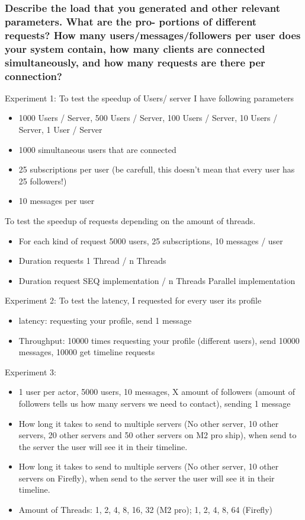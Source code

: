 \documentclass[a4paper]{article}
\begin{document}
\subsubsection{Describe the load that you generated and other relevant parameters. What are the pro-
portions of different requests? How many users/messages/followers per user does your
system contain, how many clients are connected simultaneously, and how many requests
are there per connection?}
        	Experiment 1:
		To test the speedup of Users/ server I have following parameters
		\begin{itemize}
			\item  1000 Users / Server, 500 Users / Server, 100 Users / Server, 10 Users / Server, 1 User / Server 
			\item  1000 simultaneous users that are connected
			\item  25 subscriptions per user (be carefull, this doesn't mean that every user has 25 followers!)
			\item  10 messages per user
		\end{itemize}
		To test the speedup of requests depending on the amount of threads.
		\begin{itemize}
			\item For each kind of request 5000 users, 25 subscriptions, 10 messages / user
			\item Duration requests 1 Thread / n Threads
			\item Duration request SEQ implementation / n Threads Parallel implementation 
		\end{itemize}

		Experiment 2:
		To test the latency, I requested for every user its profile
		\begin{itemize}
			\item latency: requesting your profile, send 1 message  
			\item Throughput: 10000 times requesting your profile (different users), send 10000 messages, 10000 get timeline requests 
		\end{itemize}
		Experiment 3:
		\begin{itemize}
			\item 1 user per actor, 5000 users, 10 messages, X amount of followers (amount of followers tells us how many servers we need to contact), sending 1 message  
			\item How long it takes to send to multiple servers (No other server, 10 other servers, 20 other servers and 50 other servers on M2 pro ship), when send to the server the user will see it in their timeline.
			\item How long it takes to send to multiple servers (No other server, 10 other servers on Firefly), when send to the server the user will see it in their timeline. 
			\item Amount of Threads: 1, 2, 4, 8, 16, 32 (M2 pro); 1, 2, 4, 8, 64 (Firefly)
		\end{itemize}
\end{document}
